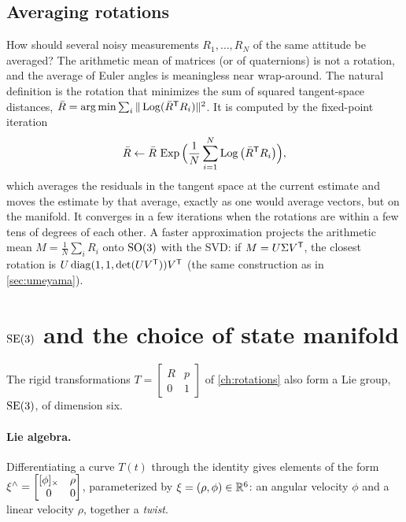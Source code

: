 \subsection{Averaging rotations}

How should several noisy measurements $R_1, \dots, R_N$ of the same attitude be averaged? The arithmetic mean of matrices (or of
quaternions) is not a rotation, and the average of Euler angles is meaningless near wrap-around. The natural definition is the rotation that
minimizes the sum of squared tangent-space distances, $\bar R = \operatorname*{arg\,min}\sum_i\|\operatorname{Log}(\bar R^{\mathsf{T}} R_i)\|^2$. It is computed by the fixed-point iteration
\begin{equation}
  \bar R \gets \bar R\,\operatorname{Exp}\Big(\frac1N\sum_{i=1}^N\operatorname{Log}\big(\bar R^{\mathsf{T}} R_i\big)\Big),
\end{equation}
which averages the residuals in the tangent space at the current estimate and moves the estimate by that average, exactly as one would
average vectors, but on the manifold. It converges in a few iterations when the rotations are within a few tens of degrees of each other.
A faster approximation projects the arithmetic mean $M = \frac1N\sum_iR_i$ onto $\mathrm{SO}(3)$ with the SVD: if $M = U\Sigma V^{\mathsf{T}}$, the closest rotation is
$U\operatorname{diag}(1, 1, \det(UV^{\mathsf{T}}))V^{\mathsf{T}}$ (the same construction as in \cref{sec:umeyama}).

\section{\texorpdfstring{$\mathrm{SE}(3)$}{SE(3)} and the choice of state manifold}
\label{sec:se3}

The rigid transformations $T = \begin{bmatrix}R & p\\0 & 1\end{bmatrix}$ of \cref{ch:rotations} also form a Lie group, $\mathrm{SE}(3)$, of dimension six.

\paragraph{Lie algebra.} Differentiating a curve $T(t)$ through the identity gives elements of the form
$\xi^{\wedge} = \begin{bmatrix}[\phi]_{\times} & \rho\\ 0 & 0\end{bmatrix}$, parameterized by $\xi = (\rho, \phi) \in \mathbb{R}^6$: an angular velocity $\phi$ and a linear velocity $\rho$,
together a \emph{twist}.

